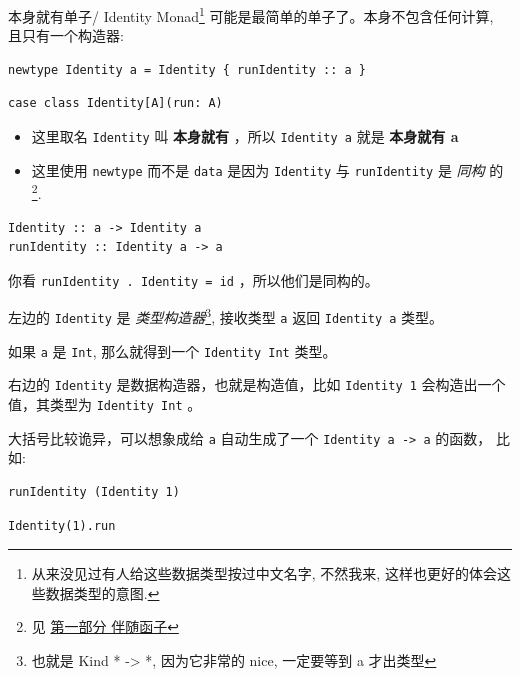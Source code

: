\documentclass[letterspacing]{tufte-book}
\begin{document}
本身就有单子/ Identity Monad\footnote{从来没见过有人给这些数据类型按过中文名字, 不然我来, 这样也更好的体会这些数据类型的意图.} 可能是最简单的单子了。本身不包含任何计算, 且只有一个构造器:
\lstset{language=haskell,label= ,caption= ,captionpos=b,numbers=none}
\begin{lstlisting}
newtype Identity a = Identity { runIdentity :: a }
\end{lstlisting}

\lstset{language=scala,label= ,caption= ,captionpos=b,numbers=none}
\begin{lstlisting}
case class Identity[A](run: A)
\end{lstlisting}

\begin{itemize}
\item 这里取名 \texttt{Identity} 叫 \textbf{本身就有} ，所以 \texttt{Identity a} 就是 \textbf{本身就有 a}
\item 这里使用 \texttt{newtype} 而不是 \texttt{data} 是因为 \texttt{Identity} 与 \texttt{runIdentity} 是 \emph{同构} 的\footnote{见 \href{part1.org}{第一部分 伴随函子}}.
\end{itemize}

\lstset{language=haskell,label= ,caption= ,captionpos=b,numbers=none}
\begin{lstlisting}
Identity :: a -> Identity a
runIdentity :: Identity a -> a
\end{lstlisting}

你看 \texttt{runIdentity . Identity = id} ，所以他们是同构的。

左边的 \texttt{Identity} 是 \emph{类型构造器}\footnote{也就是 Kind * -> *, 因为它非常的 nice, 一定要等到 a 才出类型}, 接收类型 \texttt{a} 返回 \texttt{Identity a} 类型。

如果 \texttt{a} 是 \texttt{Int}, 那么就得到一个 \texttt{Identity Int} 类型。

右边的 \texttt{Identity} 是数据构造器，也就是构造值，比如 \texttt{Identity 1} 会构造出一个值，其类型为 \texttt{Identity Int} 。

大括号比较诡异，可以想象成给 \texttt{a} 自动生成了一个 \texttt{Identity a -> a} 的函数， 比如:

\lstset{language=haskell,label= ,caption= ,captionpos=b,numbers=none}
\begin{lstlisting}
runIdentity (Identity 1)
\end{lstlisting}

\lstset{language=scala,label= ,caption= ,captionpos=b,numbers=none}
\begin{lstlisting}
Identity(1).run
\end{lstlisting}
\end{document}
